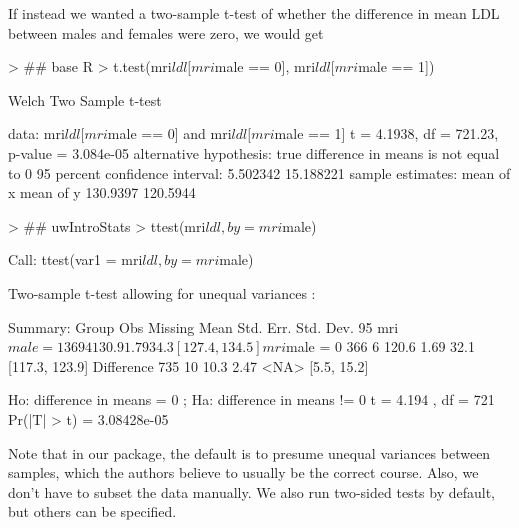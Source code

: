 \documentclass[landscape]{article}
\renewenvironment{Schunk}{\vspace{\topsep}}{\vspace{\topsep}}
\begin{document}
If instead we wanted a two-sample t-test of whether the difference in mean LDL between males and females were zero, we would get
\begin{Schunk}
\begin{Sinput}
> ## base R
> t.test(mri$ldl[mri$male == 0], mri$ldl[mri$male == 1])
\end{Sinput}
\begin{Soutput}
	Welch Two Sample t-test

data:  mri$ldl[mri$male == 0] and mri$ldl[mri$male == 1]
t = 4.1938, df = 721.23, p-value = 3.084e-05
alternative hypothesis: true difference in means is not equal to 0
95 percent confidence interval:
  5.502342 15.188221
sample estimates:
mean of x mean of y 
 130.9397  120.5944 
\end{Soutput}
\begin{Sinput}
> ## uwIntroStats
> ttest(mri$ldl, by = mri$male)
\end{Sinput}
\begin{Soutput}
Call:
ttest(var1 = mri$ldl, by = mri$male)

Two-sample t-test allowing for unequal variances :
 
Summary:
          Group Obs Missing  Mean Std. Err. Std. Dev.         95%
   mri$male = 1 369       4 130.9      1.79      34.3 [127.4, 134.5]
   mri$male = 0 366       6 120.6      1.69      32.1 [117.3, 123.9]
     Difference 735      10  10.3      2.47      <NA>    [5.5, 15.2]

 Ho: difference in  means = 0 ; 
 Ha: difference in  means != 0 
 t = 4.194 , df = 721 
 Pr(|T| > t) =  3.08428e-05 
\end{Soutput}
\end{Schunk}

Note that in our package, the default is to presume unequal variances between samples, which the authors believe to usually be the correct course. Also, we don't have to subset the data manually. We also run two-sided tests by default, but others can be specified.
\end{document}
